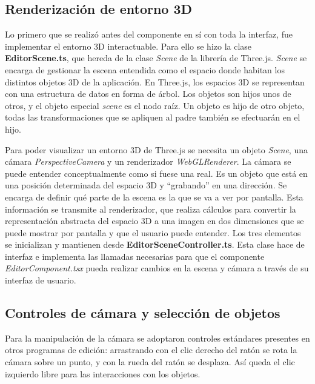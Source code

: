 \subsection{Renderización de entorno 3D}

Lo primero que se realizó antes del componente en sí con toda la interfaz, fue implementar el entorno 3D interactuable. Para ello se hizo la clase \textbf{EditorScene.ts}, que hereda de la clase \textit{Scene} de la librería de Three.js. \textit{Scene} se encarga de gestionar la escena entendida como el espacio donde habitan los distintos objetos 3D de la aplicación. En Three.js, los espacios 3D se representan con una estructura de datos en forma de árbol. Los objetos son hijos unos de otros, y el objeto especial \textit{scene} es el nodo raíz. Un objeto es hijo de otro objeto, todas las transformaciones que se apliquen al padre también se efectuarán en el hijo.

Para poder visualizar un entorno 3D de Three.js se necesita un objeto \textit{Scene}, una cámara \textit{PerspectiveCamera} y un renderizador \textit{WebGLRenderer}. La cámara se puede entender conceptualmente como si fuese una real. Es un objeto que está en una posición determinada del espacio 3D y ``grabando'' en una dirección. Se encarga de definir qué parte de la escena es la que se va a ver por pantalla. Esta información se transmite al renderizador, que realiza cálculos para convertir la representación abstracta del espacio 3D a una imagen en dos dimensiones que se puede mostrar por pantalla y que el usuario puede entender. Los tres elementos se inicializan y mantienen desde \textbf{EditorSceneController.ts}. Esta clase hace de interfaz e implementa las llamadas necesarias para que el componente \textit{EditorComponent.tsx} pueda realizar cambios en la escena y cámara a través de su interfaz de usuario.

\subsection{Controles de cámara y selección de objetos}

Para la manipulación de la cámara se adoptaron controles estándares presentes en otros programas de edición: arrastrando con el clic derecho del ratón se rota la cámara sobre un punto, y con la rueda del ratón se desplaza. Así queda el clic izquierdo libre para las interacciones con los objetos.

